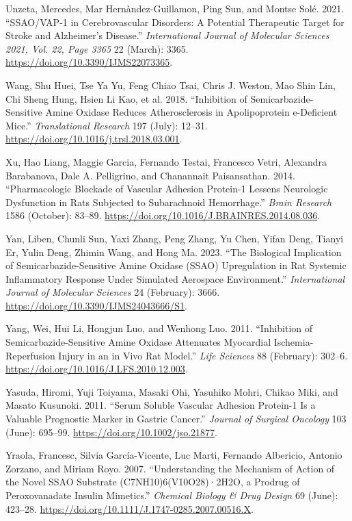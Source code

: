\documentclass[
  letterpaper,
  DIV=11,
  numbers=noendperiod]{scrreprt}
\newlength{\cslhangindent}
\newenvironment{CSLReferences}[2] %
 {\begin{list}{}{%
  \setlength{\itemindent}{0pt}
  \setlength{\leftmargin}{0pt}
  \setlength{\parsep}{0pt}
  \ifodd #1
   \setlength{\leftmargin}{\cslhangindent}
   \setlength{\itemindent}{-1\cslhangindent}
  \fi
  \setlength{\itemsep}{#2\baselineskip}}}
 {\end{list}}
\begin{document}
\begin{CSLReferences}{1}{0}
Unzeta, Mercedes, Mar Hernàndez-Guillamon, Ping Sun, and Montse Solé.
2021. {``SSAO/VAP-1 in Cerebrovascular Disorders: A Potential
Therapeutic Target for Stroke and Alzheimer's Disease.''}
\emph{International Journal of Molecular Sciences 2021, Vol. 22, Page
3365} 22 (March): 3365. \url{https://doi.org/10.3390/IJMS22073365}.

Wang, Shu Huei, Tse Ya Yu, Feng Chiao Tsai, Chris J. Weston, Mao Shin
Lin, Chi Sheng Hung, Hsien Li Kao, et al. 2018. {``Inhibition of
Semicarbazide-Sensitive Amine Oxidase Reduces Atherosclerosis in
Apolipoprotein e-Deficient Mice.''} \emph{Translational Research} 197
(July): 12--31. \url{https://doi.org/10.1016/j.trsl.2018.03.001}.

Xu, Hao Liang, Maggie Garcia, Fernando Testai, Francesco Vetri,
Alexandra Barabanova, Dale A. Pelligrino, and Chanannait Paisansathan.
2014. {``Pharmacologic Blockade of Vascular Adhesion Protein-1 Lessens
Neurologic Dysfunction in Rats Subjected to Subarachnoid Hemorrhage.''}
\emph{Brain Research} 1586 (October): 83--89.
\url{https://doi.org/10.1016/J.BRAINRES.2014.08.036}.

Yan, Liben, Chunli Sun, Yaxi Zhang, Peng Zhang, Yu Chen, Yifan Deng,
Tianyi Er, Yulin Deng, Zhimin Wang, and Hong Ma. 2023. {``The Biological
Implication of Semicarbazide-Sensitive Amine Oxidase (SSAO) Upregulation
in Rat Systemic Inflammatory Response Under Simulated Aerospace
Environment.''} \emph{International Journal of Molecular Sciences} 24
(February): 3666. \url{https://doi.org/10.3390/IJMS24043666/S1}.

Yang, Wei, Hui Li, Hongjun Luo, and Wenhong Luo. 2011. {``Inhibition of
Semicarbazide-Sensitive Amine Oxidase Attenuates Myocardial
Ischemia-Reperfusion Injury in an in Vivo Rat Model.''} \emph{Life
Sciences} 88 (February): 302--6.
\url{https://doi.org/10.1016/J.LFS.2010.12.003}.

Yasuda, Hiromi, Yuji Toiyama, Masaki Ohi, Yasuhiko Mohri, Chikao Miki,
and Masato Kusunoki. 2011. {``Serum Soluble Vascular Adhesion Protein-1
Is a Valuable Prognostic Marker in Gastric Cancer.''} \emph{Journal of
Surgical Oncology} 103 (June): 695--99.
\url{https://doi.org/10.1002/jso.21877}.

Yraola, Francesc, Silvia García-Vicente, Luc Marti, Fernando Albericio,
Antonio Zorzano, and Miriam Royo. 2007. {``Understanding the Mechanism
of Action of the Novel SSAO Substrate (C7NH10)6(V10O28)·2H2O, a Prodrug
of Peroxovanadate Insulin Mimetics.''} \emph{Chemical Biology \& Drug
Design} 69 (June): 423--28.
\url{https://doi.org/10.1111/J.1747-0285.2007.00516.X}.


\end{CSLReferences}
\end{document}
